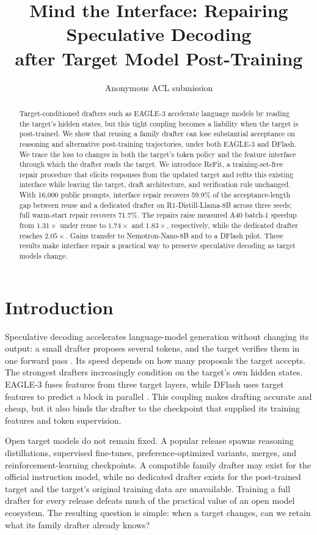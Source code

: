 \documentclass[11pt]{article}
\title{Mind the Interface: Repairing Speculative Decoding\\after Target Model Post-Training}
\author{Anonymous ACL submission}
\newcommand{\method}{ReFit}
\begin{document}
\maketitle

\begin{abstract}
Target-conditioned drafters such as EAGLE-3 accelerate language models by reading the target's hidden states, but this tight coupling becomes a liability when the target is post-trained. We show that reusing a family drafter can lose substantial acceptance on reasoning and alternative post-training trajectories, under both EAGLE-3 and DFlash. We trace the loss to changes in both the target's token policy and the feature interface through which the drafter reads the target. We introduce \method{}, a training-set-free repair procedure that elicits responses from the updated target and refits this existing interface while leaving the target, draft architecture, and verification rule unchanged. With 16,000 public prompts, interface repair recovers 59.9\% of the acceptance-length gap between reuse and a dedicated drafter on R1-Distill-Llama-8B across three seeds; full warm-start repair recovers 71.7\%. The repairs raise measured A40 batch-1 speedup from $1.31\times$ under reuse to $1.74\times$ and $1.83\times$, respectively, while the dedicated drafter reaches $2.05\times$. Gains transfer to Nemotron-Nano-8B and to a DFlash pilot. These results make interface repair a practical way to preserve speculative decoding as target models change.
\end{abstract}

\section{Introduction}
Speculative decoding accelerates language-model generation without changing its output: a small drafter proposes several tokens, and the target verifies them in one forward pass \citep{leviathan2023,chen2023}. Its speed depends on how many proposals the target accepts. The strongest drafters increasingly condition on the target's own hidden states. EAGLE-3 fuses features from three target layers, while DFlash uses target features to predict a block in parallel \citep{eagle32025,dflash2026}. This coupling makes drafting accurate and cheap, but it also binds the drafter to the checkpoint that supplied its training features and token supervision.

Open target models do not remain fixed. A popular release spawns reasoning distillations, supervised fine-tunes, preference-optimized variants, merges, and reinforcement-learning checkpoints. A compatible family drafter may exist for the official instruction model, while no dedicated drafter exists for the post-trained target and the target's original training data are unavailable. Training a full drafter for every release defeats much of the practical value of an open model ecosystem. The resulting question is simple: when a target changes, can we retain what its family drafter already knows?
\end{document}
